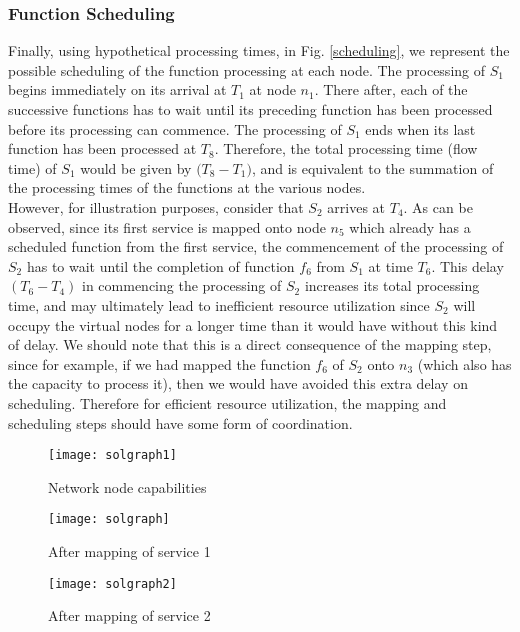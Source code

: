 \documentclass[conference]{IEEEtran}
\begin{document}
\subsubsection{Function Scheduling}\label{schedex}
Finally, using hypothetical processing times, in Fig. \ref{scheduling}, we represent the possible scheduling of the function processing at each node. The processing of $S_1$ begins immediately on its arrival at $T_1$ at node $n_1$. There after, each of the successive functions has to wait until its preceding function has been processed before its processing can commence. The processing of $S_1$ ends when its last function has been processed at $T_8$. Therefore, the total processing time (flow time) of $S_1$ would be given by $\Big(T_8 - T_1\Big)$, and is equivalent to the summation of the processing times of the functions at the various nodes.\\
\indent However, for illustration purposes, consider that $S_2$ arrives at $T_4$. As can be observed, since its first service is mapped onto node $n_5$ which already has a scheduled function from the first service, the commencement of the processing of $S_2$ has to wait until the completion of function $f_6$ from $S_1$ at time $T_6$. This delay $(T_6 - T_4)$ in commencing the processing of $S_2$ increases its total processing time, and may ultimately lead to inefficient resource utilization since $S_2$ will occupy the virtual nodes for a longer time than it would have without this kind of delay. We should note that this is a direct consequence of the mapping step, since for example, if we had mapped the function $f_6$ of $S_2$ onto $n_3$ (which also has the capacity to process it), then we would have avoided this extra delay on scheduling. Therefore for efficient resource utilization, the mapping and scheduling steps should have some form of coordination.
\begin{figure*}[t]
\setlength{\abovecaptionskip}{7pt plus 0pt minus 0pt}
\setlength{\belowcaptionskip}{-5pt plus 0pt minus 0pt}
\begin{minipage}{.33\textwidth}
\centering
\resizebox{.99\textwidth}{!}
{\texttt{[image: solgraph1]}}
  \caption{\scriptsize Network node capabilities}
  \label{state1}
\end{minipage}
\begin{minipage}{.33\textwidth}
\centering
\resizebox{0.99\textwidth}{!}
{\texttt{[image: solgraph]}}
  \caption{\scriptsize After mapping of service 1}
  \label{state2}
\end{minipage}
\begin{minipage}{.33\textwidth}
\centering
\resizebox{0.99\textwidth}{!}
{\texttt{[image: solgraph2]}}
  \caption{\scriptsize After mapping of service 2}
  \label{state3}
\end{minipage}
\end{figure*}
\end{document}

